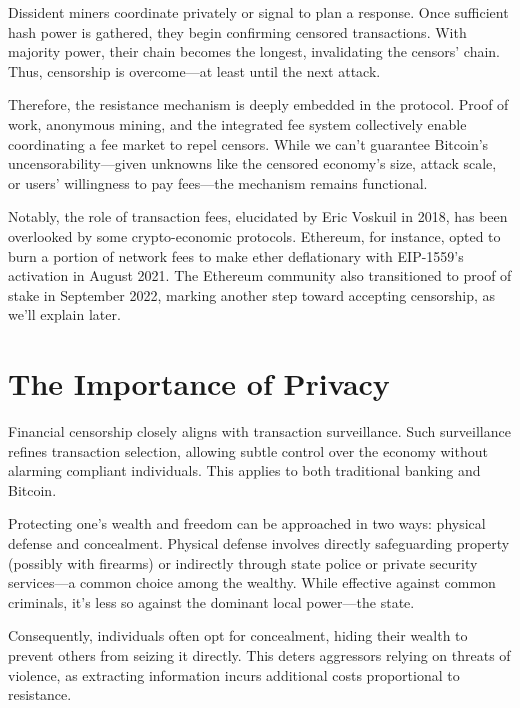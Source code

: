 \documentclass[
  a5paper,
  smalldemyvopaper,10pt,twoside,onecolumn,openright,extrafontsizes,hidelinks]{memoir}
\begin{document}
Dissident miners coordinate privately or signal to plan a response. Once
sufficient hash power is gathered, they begin confirming censored
transactions. With majority power, their chain becomes the longest,
invalidating the censors' chain. Thus, censorship is overcome---at least
until the next attack.

Therefore, the resistance mechanism is deeply embedded in the protocol.
Proof of work, anonymous mining, and the integrated fee system
collectively enable coordinating a fee market to repel censors. While we
can't guarantee Bitcoin's uncensorability---given unknowns like the
censored economy's size, attack scale, or users' willingness to pay
fees---the mechanism remains functional.

Notably, the role of transaction fees, elucidated by Eric Voskuil in
2018, has been overlooked by some crypto-economic protocols. Ethereum,
for instance, opted to burn a portion of network fees to make ether
deflationary with EIP-1559's activation in August 2021. The Ethereum
community also transitioned to proof of stake in September 2022, marking
another step toward accepting censorship, as we'll explain later.

\section*{The Importance of
Privacy}\label{limportance-de-la-confidentialituxe9}


Financial censorship closely aligns with transaction surveillance. Such
surveillance refines transaction selection, allowing subtle control over
the economy without alarming compliant individuals. This applies to both
traditional banking and Bitcoin.

Protecting one's wealth and freedom can be approached in two ways:
physical defense and concealment. Physical defense involves directly
safeguarding property (possibly with firearms) or indirectly through
state police or private security services---a common choice among the
wealthy. While effective against common criminals, it's less so against
the dominant local power---the state.

Consequently, individuals often opt for concealment, hiding their wealth
to prevent others from seizing it directly. This deters aggressors
relying on threats of violence, as extracting information incurs
additional costs proportional to resistance.
\end{document}
